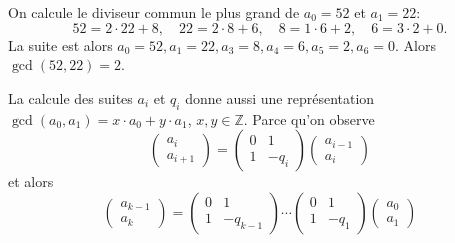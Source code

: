 \begin{example}
  \label{exe:25}
  On calcule  le diviseur commun le plus grand de $a_0 = 52$ et $a_1=22$:
  \begin{displaymath}
    52 =   2 ⋅ 22 + 8, \quad 22 = 2 ⋅ 8  + 6, \quad 8 = 1 ⋅ 6 +2,\quad 6 = 3 ⋅2 + 0. 
  \end{displaymath}
  La suite est alors $a_{0}= 52, a_{1}= 22, a_{3} = 8, a_{4} = 6, a_{5} = 2, a_{6} = 0$. Alors $\gcd(52,22) = 2$. 
\end{example}

La calcule des suites $a_i$ et $q_i$ donne aussi une représentation $\gcd(a_0,a_1) = x ⋅a_0 + y ⋅a_1$, $x,y ∈ℤ$. Parce qu'on observe
\begin{displaymath}
  \begin{pmatrix}
    a_{i} \\  a_{i+1} 
  \end{pmatrix}
  =
  \begin{pmatrix}
    0 & 1 \\
    1 & -q_i
  \end{pmatrix}
  \begin{pmatrix}
     a_{i-1} \\  a_{i}
   \end{pmatrix}
\end{displaymath}
et alors
\begin{displaymath}
  \begin{pmatrix}
    a_{k-1} \\ a_k
  \end{pmatrix} =
  \begin{pmatrix}
    0 & 1 \\
    1 & -q_{k-1}
  \end{pmatrix} \cdots
  \begin{pmatrix}
    0 & 1 \\
    1 & -q_{1}
  \end{pmatrix}
  \begin{pmatrix}
    a_0 \\ a_1
  \end{pmatrix}
\end{displaymath}
